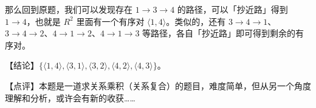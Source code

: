 \documentclass[UTF8]{ctexart}
\newcommand\relation[2]{\langle #1,#2 \rangle}
\begin{document}
那么回到原题，我们可以发现存在 $1\to 3\to 4$ 的路径，可以「抄近路」得到 $1\to 4$，也就是 $R^2$ 里面有一个有序对 $\relation{1}{4}$。类似的，还有 $3\to 4\to 1$、$3\to 4\to 2$、$4\to 1\to 2$、$4\to 1\to 3$ 等路径，各自「抄近路」即可得到剩余的有序对。

\vspace{0.2cm}

\textcolor{cyan!80!black}{【结论】$\{\relation{1}{4}, \relation{3}{1}, \relation{3}{2}, \relation{4}{2}, \relation{4}{3}\}$。}

\textcolor{cyan!80!black}{【点评】本题是一道求关系乘积（关系复合）的题目，难度简单，但从另一个角度理解和分析，或许会有新的收获……}


%
%
%
%
%
%
\end{document}
